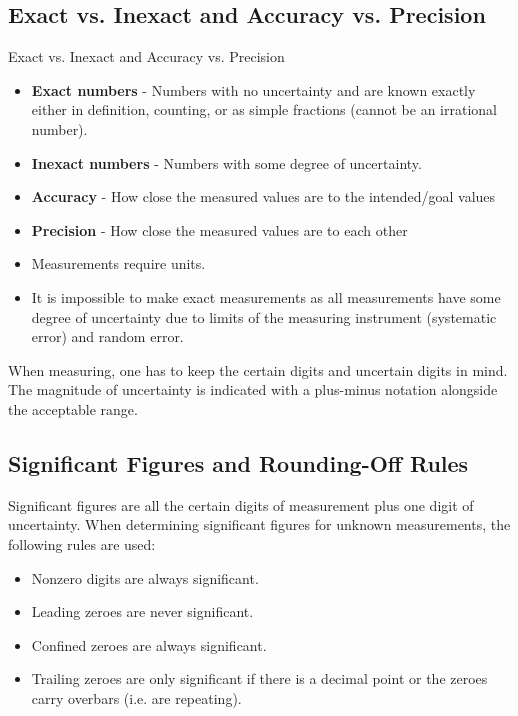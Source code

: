 \subsection{Exact vs. Inexact and Accuracy vs. Precision}
\begin{defn}
Exact vs. Inexact and Accuracy vs. Precision
\begin{itemize}
	\item \textbf{Exact numbers} - Numbers with no uncertainty and are known exactly either in definition, counting, or as simple fractions (cannot be an irrational number). 
	\item \textbf{Inexact numbers} - Numbers with some degree of uncertainty.
	\item \textbf{Accuracy} - How close the measured values are to the intended/goal values
	\item \textbf{Precision} - How close the measured values are to each other
\end{itemize}
\end{defn}

\begin{itemize}
\item Measurements require units.
\item It is impossible to make exact measurements as all measurements have some degree of uncertainty due to limits of the measuring instrument (systematic error) and random error.
\end{itemize}

When measuring, one has to keep the certain digits and uncertain digits in mind. The magnitude of uncertainty is indicated with a plus-minus notation alongside the acceptable range.

\subsection{Significant Figures and Rounding-Off Rules}
Significant figures are all the certain digits of measurement plus one digit of uncertainty. When determining significant figures for unknown measurements, the following rules are used:

\begin{itemize}
	\item Nonzero digits are always significant.
	\item Leading zeroes are never significant.
	\item Confined zeroes are always significant.
	\item Trailing zeroes are only significant if there is a decimal point or the zeroes carry overbars (i.e. are repeating).
\end{itemize}

